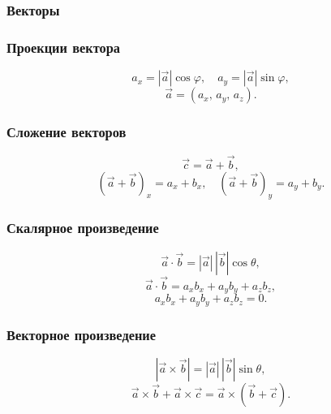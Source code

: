 \documentclass[12pt, a4paper]{article}
\begin{document}
\subsubsection*{Векторы}

\subsubsection*{Проекции вектора}
\[
a_x = |\vec a|\cos\varphi,\quad a_y = |\vec a|\sin\varphi,
\]
\[
\vec a = (a_x,\,a_y,\,a_z).
\]

\subsubsection*{Сложение векторов}
\[
\vec c = \vec a + \vec b,
\]
\[
(\vec a + \vec b)_x = a_x + b_x,\quad (\vec a + \vec b)_y = a_y + b_y.
\]

\subsubsection*{Скалярное произведение}
\[
\vec a \cdot \vec b = |\vec a|\,|\vec b|\cos\theta,
\]
\[
\vec a \cdot \vec b = a_x b_x + a_y b_y + a_z b_z,
\]
\[
a_x b_x + a_y b_y + a_z b_z = 0.
\]

\subsubsection*{Векторное произведение}
\[
|\vec a \times \vec b| = |\vec a|\,|\vec b|\sin\theta,
\]
\[
\vec a \times \vec b + \vec a \times \vec c = \vec a \times (\vec b + \vec c).
\]
\end{document}
